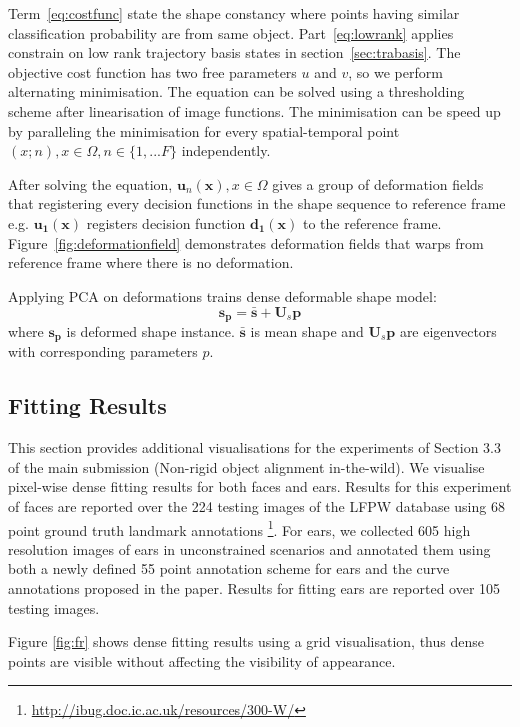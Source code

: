 Term~\eqref{eq:costfunc} state the shape constancy where points having similar classification probability are from same object.
Part~\eqref{eq:lowrank} applies constrain on low rank trajectory basis states in section~\ref{sec:trabasis}.
The objective cost function has two free parameters $u$ and $v$, so we perform alternating minimisation. The equation can be solved using a thresholding scheme after linearisation of image functions. The minimisation can be speed up by paralleling the minimisation for every spatial-temporal point $(x;n), x \in \Omega, n \in \{1,...F\}$ independently.

After solving the equation, $\bm{u}_n(\bm{x}), x \in \Omega$ gives a group of deformation fields that registering every decision functions in the shape sequence to reference frame e.g. $\bm{u_1}(\bm{x})$ registers decision function $\bm{d_1}(\bm{x})$ to the reference frame. Figure~\ref{fig:deformationfield} demonstrates deformation fields that warps from reference frame where there is no deformation.

Applying PCA on deformations trains dense deformable shape model:
\begin{equation*}
    \bm{s_p}=\bm{\bar{s}} + \bm{U}_s\bm{p}
\end{equation*}
where $\bm{s_p}$ is deformed shape instance. $\bm{\bar{s}}$ is mean shape and $\bm{U}_s\bm{p}$ are eigenvectors with corresponding parameters $p$. 


\subsection{Fitting Results}
\label{sec:daam_fittingresults}
This section provides additional visualisations for the experiments of Section 3.3 of the main submission (Non-rigid object alignment in-the-wild). We visualise pixel-wise dense fitting results for both faces and ears. Results for this experiment of faces are reported over the 224 testing images of the LFPW database using 68 point ground truth landmark annotations
\footnote{\label{ibug_300} \url{http://ibug.doc.ic.ac.uk/resources/300-W/}}.
For ears, we collected 605 high resolution images of ears in unconstrained scenarios and annotated them using both a newly defined 55 point annotation scheme for ears and the curve annotations proposed in the paper. Results for fitting ears are reported over 105 testing images.

Figure \ref{fig:fr} shows dense fitting results using a grid visualisation, thus dense points are visible without affecting the visibility of appearance.


